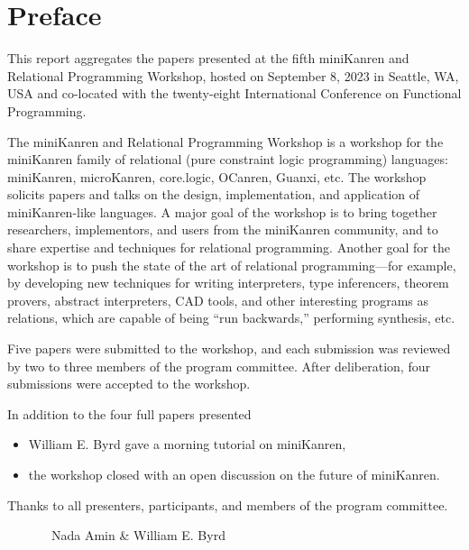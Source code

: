 \documentclass[a4paper]{book}
\begin{document}
\chapter*{Preface}
This report aggregates the papers presented at the fifth miniKanren
and Relational Programming Workshop, hosted on September 8, 2023 in
Seattle, WA, USA and co-located with the twenty-eight International
Conference on Functional Programming.

\vspace{5pt}
\noindent
The miniKanren and Relational Programming Workshop is a workshop for the miniKanren family of relational (pure constraint logic programming) languages: miniKanren, microKanren, core.logic, OCanren, Guanxi, etc. The workshop solicits papers and talks on the design, implementation, and application of miniKanren-like languages. A major goal of the workshop is to bring together researchers, implementors, and users from the miniKanren community, and to share expertise and techniques for relational programming. Another goal for the workshop is to push the state of the art of relational programming—for example, by developing new techniques for writing interpreters, type inferencers, theorem provers, abstract interpreters, CAD tools, and other interesting programs as relations, which are capable of being “run backwards,” performing synthesis, etc.

\vspace{5pt}
\noindent
Five papers were submitted to the workshop, and each submission was reviewed by
two to three members of the program committee.  After deliberation, four submissions were accepted to the workshop.

\vspace{5pt}
\noindent
In addition to the four full papers presented
\begin{itemize}
\item William E. Byrd gave a morning tutorial on miniKanren,
\item the workshop closed with an open discussion on the future of miniKanren.
\end{itemize}

\vspace{5pt}
\noindent
Thanks to all presenters, participants, and members of the
program committee.

\vspace{5pt}

\ \ \ \ \ \ \ Nada Amin \& William E. Byrd

\vspace{5pt}
\end{document}
